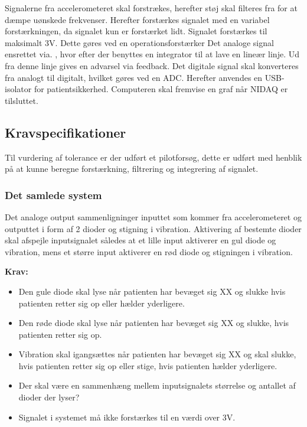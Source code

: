 Signalerne fra accelerometeret skal forstrækes, herefter støj skal filteres fra for at dæmpe uønskede frekvenser. Herefter forstærkes signalet med en variabel forstærkningen, da signalet kun er forstærket lidt. Signalet forstærkes til maksimalt 3V. Dette gøres ved en operationsforstærker  Det analoge signal ensrettet via. , hvor efter der benyttes en integrator til at lave en lineær linje. Ud fra denne linje gives en advarsel via feedback. Det digitale signal skal konverteres fra analogt til digitalt, hvilket gøres ved en ADC.  Herefter anvendes en USB-isolator for patientsikkerhed. Computeren skal fremvise en graf når NIDAQ er tilsluttet. 

\subsection{Kravspecifikationer}
Til vurdering af tolerance er der udført et pilotforsøg, dette er udført med henblik på at kunne beregne forstærkning, filtrering og integrering af signalet. 

\subsubsection{Det samlede system}
Det analoge output sammenligninger inputtet som kommer fra accelerometeret og outputtet i form af 2 dioder og stigning i vibration. Aktivering af bestemte dioder skal afspejle inputsignalet således at et lille input aktiverer en gul diode og vibration, mens et større input aktiverer en rød diode og stigningen i vibration. 

\textbf{Krav:}
\begin{itemize}
\item Den gule diode skal lyse når patienten har bevæget sig XX og slukke hvis patienten retter sig op eller hælder yderligere.
\item Den røde diode skal lyse når patienten har bevæget sig XX og slukke, hvis patienten retter sig op.
\item Vibration skal igangsættes når patienten har bevæget sig XX og skal slukke, hvis patienten retter sig op eller stige, hvis patienten hælder yderligere.
\item Der skal være en sammenhæng mellem inputsignalets størrelse og antallet af dioder der lyser?
\item Signalet i systemet må ikke forstærkes til en værdi over 3V.
\end{itemize}

